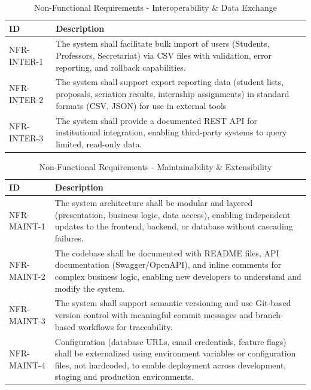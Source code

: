 {
    \begin{table}[H]
        \centering
        \caption{Non-Functional Requirements - Interoperability \& Data Exchange}
        \begin{tabular}{|l|p{11cm}|} %
            \hline
            \textbf{ID} & \textbf{Description} \\ \hline
            NFR-INTER-1 & The system shall facilitate bulk import of users (Students, Professors, Secretariat) via CSV files with validation, error reporting, and rollback capabilities. \\ \hline
            NFR-INTER-2 & The system shall support export reporting data (student lists, proposals, seriation results, internship assignments) in standard formats (CSV, JSON) for use in external tools \\ \hline
            NFR-INTER-3 & The system shall provide a documented REST API for institutional integration, enabling third-party systems to query limited, read-only data. \\ \hline
        \end{tabular}
    \end{table}    
}

{
    \begin{table}[H]
        \centering
        \caption{Non-Functional Requirements - Maintainability \& Extensibility}
        \begin{tabular}{|l|p{11cm}|} %
            \hline
            \textbf{ID} & \textbf{Description} \\ \hline
            NFR-MAINT-1 & The system architecture shall be modular and layered (presentation, business logic, data access), enabling independent updates to the frontend, backend, or database without cascading failures. \\ \hline
            NFR-MAINT-2 & The codebase shall be documented with README files, API documentation (Swagger/OpenAPI), and inline comments for complex business logic, enabling new developers to understand and modify the system. \\ \hline
            NFR-MAINT-3 & The system shall support semantic versioning and use Git-based version control with meaningful commit messages and branch-based workflows for traceability. \\ \hline
            NFR-MAINT-4 & Configuration (database URLs, email credentials, feature flags) shall be externalized using environment variables or configuration files, not hardcoded, to enable deployment across development, staging and production environments. \\ \hline
        \end{tabular}
    \end{table}    
}

